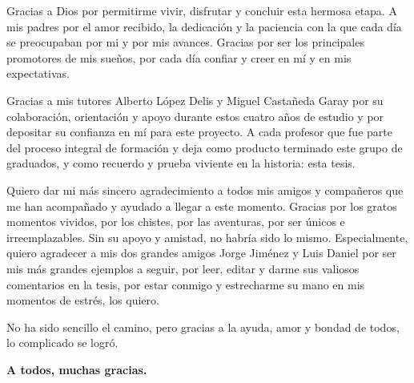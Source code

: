 \begin{acknowledgements}
Gracias a Dios por permitirme vivir, disfrutar y concluir esta hermosa etapa. A mis padres por el amor recibido, la dedicación y la paciencia con la que cada día se preocupaban por mi y por mis avances. Gracias por ser los principales promotores de mis sueños, por cada día confiar y creer en mí y en mis expectativas.

Gracias a mis tutores Alberto López Delis y Miguel Castañeda Garay por su colaboración, orientación y apoyo durante estos cuatro años de estudio y por depositar su confianza en mí para este proyecto. A cada profesor que fue parte del proceso integral de formación y deja como producto terminado este grupo de graduados, y como recuerdo y prueba viviente en la historia: esta tesis. 

Quiero dar mi más sincero agradecimiento a todos mis amigos y compañeros que me han acompañado y ayudado a llegar a este momento. Gracias por los gratos momentos vividos, por los chistes, por las aventuras, por ser únicos e irreemplazables. Sin su apoyo y amistad, no habría sido lo mismo. Especialmente, quiero agradecer a mis dos grandes amigos Jorge Jiménez y Luis Daniel por ser mis más grandes ejemplos a seguir, por leer, editar y darme sus valiosos comentarios en la tesis, por estar conmigo y estrecharme su mano en mis momentos de estrés, los quiero. 

No ha sido sencillo el camino, pero gracias a la ayuda, amor y bondad de todos, lo complicado se logró.
\begin{flushright}
    \textbf{A todos, muchas gracias.} 
\end{flushright} 
\end{acknowledgements}